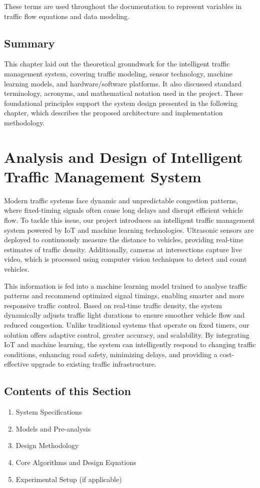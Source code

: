 \documentclass[12pt]{report}
\begin{document}
These terms are used throughout the documentation to represent variables in traffic flow equations and data modeling.


\section*{Summary}

This chapter laid out the theoretical groundwork for the intelligent traffic management system, covering traffic modeling, sensor technology, machine learning models, and hardware/software platforms. It also discussed standard terminology, acronyms, and mathematical notation used in the project. These foundational principles support the system design presented in the following chapter, which describes the proposed architecture and implementation methodology.


\chapter{Analysis and Design of Intelligent Traffic Management System}

Modern traffic systems face dynamic and unpredictable congestion patterns, where fixed-timing signals often cause long delays and disrupt efficient vehicle flow. To tackle this issue, our project introduces an intelligent traffic management system powered by IoT and machine learning technologies. Ultrasonic sensors are deployed to continuously measure the distance to vehicles, providing real-time estimates of traffic density. Additionally, cameras at intersections capture live video, which is processed using computer vision techniques to detect and count vehicles.

This information is fed into a machine learning model trained to analyse traffic patterns and recommend optimized signal timings, enabling smarter and more responsive traffic control. Based on real-time traffic density, the system dynamically adjusts traffic light durations to ensure smoother vehicle flow and reduced congestion. Unlike traditional systems that operate on fixed timers, our solution offers adaptive control, greater accuracy, and scalability. By integrating IoT and machine learning, the system can intelligently respond to changing traffic conditions, enhancing road safety, minimizing delays, and providing a cost-effective upgrade to existing traffic infrastructure.

\vspace{0.3cm}
\section{Contents of this Section}
\begin{enumerate}
\item System Specifications
\item Models and Pre-analysis
\item Design Methodology
\item Core Algorithms and Design Equations
\item Experimental Setup (if applicable)
\end{enumerate}
\end{document}

